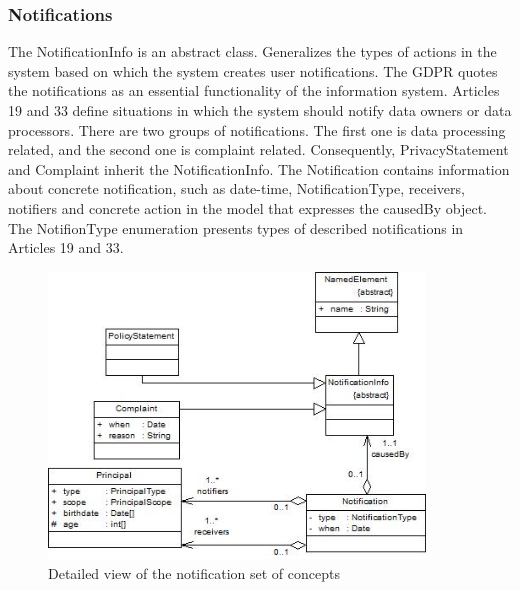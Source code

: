 \documentclass[11pt,english]{article}
\begin{document}
\subsubsection{Notifications}
The NotificationInfo is an abstract class. Generalizes the types of actions in the system based on which the system creates user notifications. The GDPR quotes the notifications as an essential functionality of the information system. Articles 19 and 33 define situations in which the system should notify data owners or data processors. There are two groups of notifications. The first one is data processing related, and the second one is complaint related. Consequently, PrivacyStatement and Complaint inherit the NotificationInfo. The Notification contains information about concrete notification, such as date-time, NotificationType, receivers, notifiers and concrete action in the model that expresses the causedBy object. The NotifionType enumeration presents types of described notifications in Articles 19 and 33.
\begin{figure}[H]
    \centering
    \includegraphics[width=10cm,scale=0.5]{images/notification.jpg}
    \caption{Detailed view of the notification set of concepts}
    \label{fig:Notifications}
\end{figure}
\end{document}
